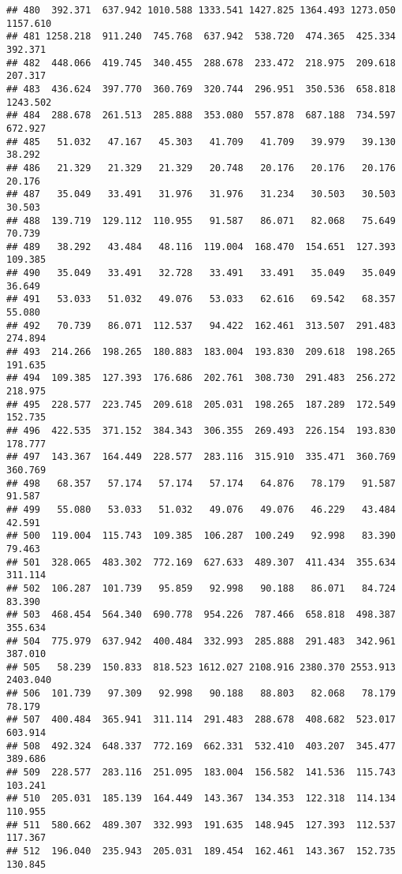 \documentclass[
]{article}
\begin{document}
\begin{verbatim}
## 480  392.371  637.942 1010.588 1333.541 1427.825 1364.493 1273.050 1157.610
## 481 1258.218  911.240  745.768  637.942  538.720  474.365  425.334  392.371
## 482  448.066  419.745  340.455  288.678  233.472  218.975  209.618  207.317
## 483  436.624  397.770  360.769  320.744  296.951  350.536  658.818 1243.502
## 484  288.678  261.513  285.888  353.080  557.878  687.188  734.597  672.927
## 485   51.032   47.167   45.303   41.709   41.709   39.979   39.130   38.292
## 486   21.329   21.329   21.329   20.748   20.176   20.176   20.176   20.176
## 487   35.049   33.491   31.976   31.976   31.234   30.503   30.503   30.503
## 488  139.719  129.112  110.955   91.587   86.071   82.068   75.649   70.739
## 489   38.292   43.484   48.116  119.004  168.470  154.651  127.393  109.385
## 490   35.049   33.491   32.728   33.491   33.491   35.049   35.049   36.649
## 491   53.033   51.032   49.076   53.033   62.616   69.542   68.357   55.080
## 492   70.739   86.071  112.537   94.422  162.461  313.507  291.483  274.894
## 493  214.266  198.265  180.883  183.004  193.830  209.618  198.265  191.635
## 494  109.385  127.393  176.686  202.761  308.730  291.483  256.272  218.975
## 495  228.577  223.745  209.618  205.031  198.265  187.289  172.549  152.735
## 496  422.535  371.152  384.343  306.355  269.493  226.154  193.830  178.777
## 497  143.367  164.449  228.577  283.116  315.910  335.471  360.769  360.769
## 498   68.357   57.174   57.174   57.174   64.876   78.179   91.587   91.587
## 499   55.080   53.033   51.032   49.076   49.076   46.229   43.484   42.591
## 500  119.004  115.743  109.385  106.287  100.249   92.998   83.390   79.463
## 501  328.065  483.302  772.169  627.633  489.307  411.434  355.634  311.114
## 502  106.287  101.739   95.859   92.998   90.188   86.071   84.724   83.390
## 503  468.454  564.340  690.778  954.226  787.466  658.818  498.387  355.634
## 504  775.979  637.942  400.484  332.993  285.888  291.483  342.961  387.010
## 505   58.239  150.833  818.523 1612.027 2108.916 2380.370 2553.913 2403.040
## 506  101.739   97.309   92.998   90.188   88.803   82.068   78.179   78.179
## 507  400.484  365.941  311.114  291.483  288.678  408.682  523.017  603.914
## 508  492.324  648.337  772.169  662.331  532.410  403.207  345.477  389.686
## 509  228.577  283.116  251.095  183.004  156.582  141.536  115.743  103.241
## 510  205.031  185.139  164.449  143.367  134.353  122.318  114.134  110.955
## 511  580.662  489.307  332.993  191.635  148.945  127.393  112.537  117.367
## 512  196.040  235.943  205.031  189.454  162.461  143.367  152.735  130.845

\end{verbatim}
\end{document}
